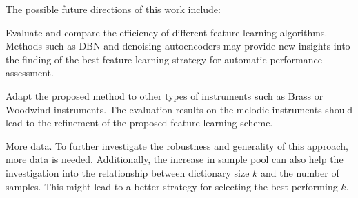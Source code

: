 \documentclass{article}
\begin{document}
The possible future directions of this work include: 
\begin{inparaenum}[(i)]
    \item   Evaluate and compare the efficiency of different feature learning algorithms. Methods such as DBN\cite{Hamel2010} and denoising autoencoders \cite{Vincent2008} may provide new insights into the finding of the best feature learning strategy for automatic performance assessment.
    \item   Adapt the proposed method to other types of instruments such as Brass or Woodwind instruments. The evaluation results on the melodic instruments should lead to the refinement of the proposed feature learning scheme. 
    \item   More data. To further investigate the robustness and generality of this approach, more data is needed. Additionally, the increase in sample pool can also help the investigation into the relationship between dictionary size $k$ and the number of samples. This might lead to a better strategy for selecting the best performing $k$. 
\end{inparaenum}


\end{document}
